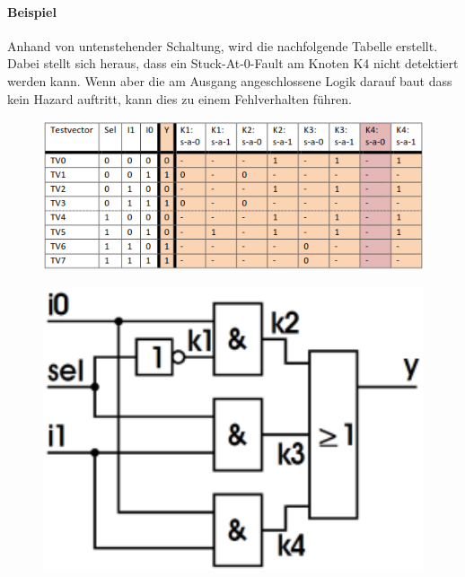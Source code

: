 \paragraph{Beispiel}
Anhand von untenstehender Schaltung, wird die nachfolgende Tabelle erstellt. Dabei stellt sich heraus, dass ein Stuck-At-0-Fault am Knoten K4 nicht detektiert werden kann. Wenn aber die am Ausgang angeschlossene Logik darauf baut dass kein Hazard auftritt, kann dies zu einem Fehlverhalten führen.\\
\begin{minipage}{0.6\textwidth}
\begin{figure}[H]
    \includegraphics[width=1.0\textwidth]{images/stuckat_redundant_1.png}
\end{figure}
\end{minipage}
\hfill
\begin{minipage}{0.35\textwidth}
\begin{figure}[H]
    \includegraphics[width=1.0\textwidth]{images/stuckat_redundant_schaltung.png}
\end{figure}
\end{minipage}
